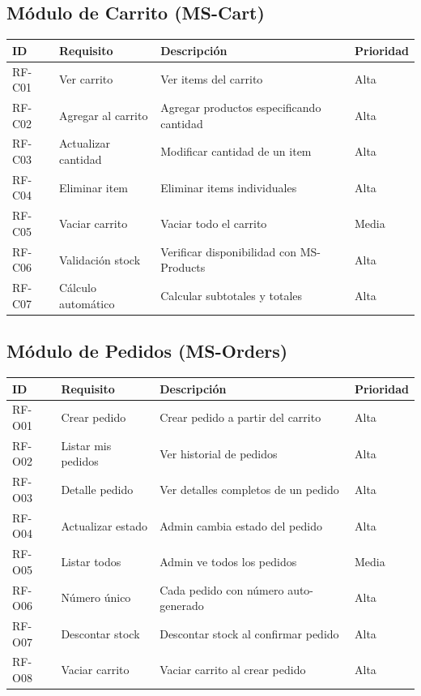 \documentclass[12pt,a4paper]{article}
\begin{document}
\subsection{M\'odulo de Carrito (MS-Cart)}
\begin{longtable}{llp{7cm}l}
\toprule
\textbf{ID} & \textbf{Requisito} & \textbf{Descripci\'on} & \textbf{Prioridad} \\
\midrule
\endhead
RF-C01 & Ver carrito & Ver items del carrito & Alta \\
RF-C02 & Agregar al carrito & Agregar productos especificando cantidad & Alta \\
RF-C03 & Actualizar cantidad & Modificar cantidad de un item & Alta \\
RF-C04 & Eliminar item & Eliminar items individuales & Alta \\
RF-C05 & Vaciar carrito & Vaciar todo el carrito & Media \\
RF-C06 & Validaci\'on stock & Verificar disponibilidad con MS-Products & Alta \\
RF-C07 & C\'alculo autom\'atico & Calcular subtotales y totales & Alta \\
\bottomrule
\end{longtable}

\subsection{M\'odulo de Pedidos (MS-Orders)}
\begin{longtable}{llp{7cm}l}
\toprule
\textbf{ID} & \textbf{Requisito} & \textbf{Descripci\'on} & \textbf{Prioridad} \\
\midrule
\endhead
RF-O01 & Crear pedido & Crear pedido a partir del carrito & Alta \\
RF-O02 & Listar mis pedidos & Ver historial de pedidos & Alta \\
RF-O03 & Detalle pedido & Ver detalles completos de un pedido & Alta \\
RF-O04 & Actualizar estado & Admin cambia estado del pedido & Alta \\
RF-O05 & Listar todos & Admin ve todos los pedidos & Media \\
RF-O06 & N\'umero \'unico & Cada pedido con n\'umero auto-generado & Alta \\
RF-O07 & Descontar stock & Descontar stock al confirmar pedido & Alta \\
RF-O08 & Vaciar carrito & Vaciar carrito al crear pedido & Alta \\
\bottomrule
\end{longtable}
\end{document}
